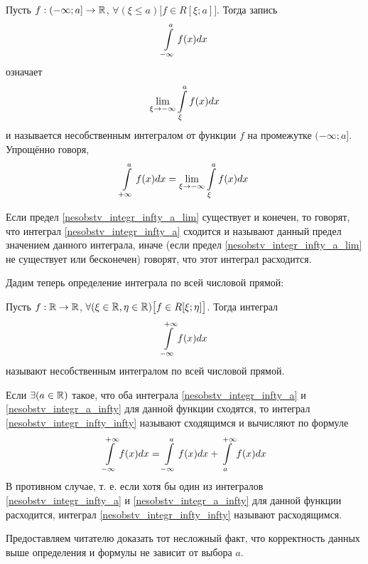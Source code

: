 \begin{opr}
Пусть $f:(-\infty;a]\to\mathbb{R}$, $\forall(\xi\leq a)\bigl[f\in R[\xi;a]\bigr]$.
Тогда запись
\begin{equation}\label{nesobstv_integr_infty_a}
\int\limits^a_{-\infty} f(x) dx
\end{equation}
означает 
\begin{equation}\label{nesobstv_integr_infty_a_lim}
\lim_{\xi\to-\infty} \int\limits^a_\xi f(x) dx
\end{equation}
и называется несобственным интегралом от функции $f$ на промежутке $(-\infty;a]$.
Упрощённо говоря,
\begin{equation}\label{nesobstv_integr_infty_a_raven_lim}
\int\limits^a_{+\infty} f(x) dx
=
\lim_{\xi\to-\infty} \int\limits^a_\xi f(x) dx
\end{equation}
\end{opr}
\begin{opr}
Если предел \ref{nesobstv_integr_infty_a_lim} существует и конечен, то говорят, что интеграл \ref{nesobstv_integr_infty_a} сходится и называют данный предел значением данного интеграла, иначе (если предел \ref{nesobstv_integr_infty_a_lim} не существует или бесконечен) говорят, что этот интеграл расходится.
\end{opr}

Дадим теперь определение интеграла по всей числовой прямой:
\begin{opr}\label{opr_nesobstv_integr_infty_infty}
Пусть $f:\mathbb{R}\to\mathbb{R}$, $\forall(\xi\in\mathbb{R},\eta\in\mathbb{R})\bigl[f\in R[\xi;\eta]\bigr]$.
Тогда интеграл
\begin{equation}\label{nesobstv_integr_infty_infty}
	\int\limits^{+\infty}_{-\infty} f(x) dx
\end{equation}
называют несобственным интегралом по всей числовой прямой.
\end{opr}

\begin{opr}
Если $\exists(a\in\mathbb{R})$ такое, что оба интеграла \ref{nesobstv_integr_infty_a} и \ref{nesobstv_integr_a_infty} для данной функции сходятся, то интеграл \ref{nesobstv_integr_infty_infty} называют сходящимся и вычисляют по формуле
\begin{equation}\label{nesobstv_integr_po_neogr_promezh_raven_sum}
\int\limits^{+\infty}_{-\infty} f(x) dx = \int\limits^a_{-\infty} f(x) dx + \int\limits^{+\infty}_a f(x) dx
\end{equation}
В противном случае, т. е. если хотя бы один из интегралов \ref{nesobstv_integr_infty_a} и \ref{nesobstv_integr_a_infty} для данной функции расходится, интеграл \ref{nesobstv_integr_infty_infty} называют расходящимся.
\end{opr}

\begin{zamech}
Предоставляем читателю доказать тот несложный факт, что корректность данных выше определения и формулы не зависит от выбора $a$.
\end{zamech}

